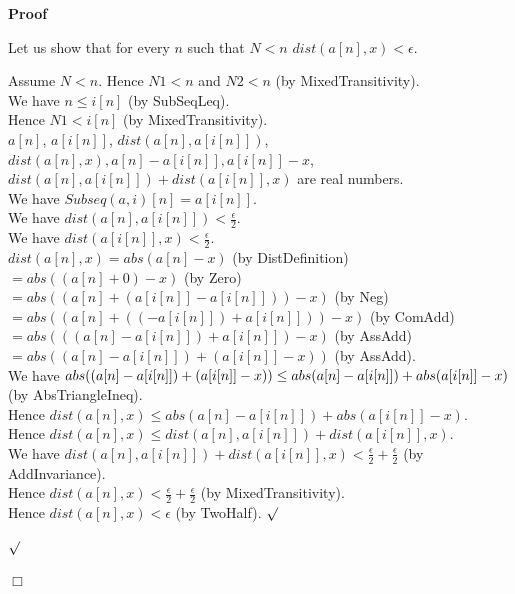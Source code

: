 \documentclass{article}
\newenvironment{forthel}{\begin{leftbar}}{\end{leftbar}}
\newenvironment{proof}{\noindent\textbf{Proof\ }}{\hspace*{\fill}$\Box$\medskip}
\newenvironment{subproof}{\begin{list}{}{}
		\item[\text{Proof}]}{\hfill $\surd$ \end{list}}
\newcommand{\halfeps}{\frac{\epsilon}{2}}
\newcommand{\dotequal}{=}
\begin{document}
\begin{forthel}
\begin{proof}
\begin{subproof}
			Let us show that for every $n$ such that $N < n$ $dist(a[n],x) < \epsilon$.
			\begin{subproof}
				Assume $N < n$. Hence $N1 < n$ and $N2 < n$ (by MixedTransitivity).\\
				We have $n \leq i[n]$ (by SubSeqLeq).\\
				Hence $N1 < i[n]$ (by MixedTransitivity).\\
				
				$a[n]$, $a[i[n]]$, $dist(a[n],a[i[n]])$, $dist(a[n],x), a[n] - a[i[n]], a[i[n]] - x$, $dist(a[n],a[i[n]]) + dist(a[i[n]],x)$ are real numbers.\\
				
				We have $Subseq(a,i)[n] = a[i[n]]$.\\
				We have $dist(a[n],a[i[n]]) < \halfeps$.\\
				We have $dist(a[i[n]],x) < \halfeps$.\\
				
				$dist(a[n],x) \dotequal abs(a[n] - x)$ (by DistDefinition)\\
				$\dotequal abs((a[n] + 0) - x)$ (by Zero)\\
				$\dotequal abs((a[n] + (a[i[n]] - a[i[n]])) - x)$ (by Neg)\\
				$\dotequal abs((a[n] + ((-a[i[n]]) + a[i[n]])) - x)$ (by ComAdd)\\
				$\dotequal abs(((a[n] - a[i[n]]) + a[i[n]]) - x)$ (by AssAdd)\\
				$\dotequal abs((a[n] - a[i[n]]) + (a[i[n]] - x))$ (by AssAdd).\\
				
				We have $abs((a[n] - a[i[n]]) + (a[i[n]] - x))\\ \leq abs(a[n] - a[i[n]]) + abs(a[i[n]] - x)$ (by AbsTriangleIneq).\\
				Hence $dist(a[n],x) \leq abs(a[n] - a[i[n]]) + abs(a[i[n]] - x)$.\\
				Hence $dist(a[n],x) \leq dist(a[n],a[i[n]]) + dist(a[i[n]],x)$.\\
				We have $dist(a[n],a[i[n]]) + dist(a[i[n]],x) < \halfeps + \halfeps$ (by AddInvariance).\\
				Hence $dist(a[n],x) < \halfeps + \halfeps$ (by MixedTransitivity).\\
				Hence $dist(a[n],x) < \epsilon$ (by TwoHalf).
			\end{subproof}
			
		\end{subproof}
	\end{proof}
	

\end{forthel}
\end{document}

